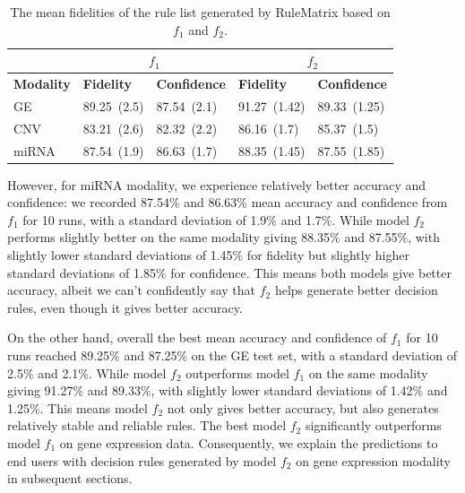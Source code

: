 \begin{table}[h!]
    \centering
    \caption{The mean fidelities of the rule list generated by RuleMatrix based on $f_1$ and $f_2$.}
    \label{table:rules_overall_result}
    \vspace{-2mm}
    \scriptsize{
    \begin{tabular}{l|l|l|l|l} 
        \hline
         & \multicolumn{2}{c|}{$f_1$} & \multicolumn{2}{c}{$f_2$} \\ 
        \hline
        \textbf{Modality} & \textbf{Fidelity} & \textbf{Confidence} & \textbf{Fidelity} & \textbf{Confidence} \\ 
        \hline
        GE  & 89.25~(2.5) & 87.54~(2.1) & 91.27~(1.42) & 89.33~(1.25) \\ 
        \cline{1-3}\cline{4-5}
        CNV & 83.21~(2.6) & 82.32~(2.2) & 86.16~(1.7) & 85.37~(1.5) \\ 
        \hline
        miRNA & 87.54~(1.9) & 86.63~(1.7) & 88.35~(1.45) & 87.55~(1.85) \\
        \hline
    \end{tabular}}
    \vspace{-4mm}
\end{table}

However, for miRNA modality, we experience relatively better accuracy and confidence: we recorded 87.54\% and 86.63\% mean accuracy and confidence from $f_1$ for 10 runs, with a standard deviation of 1.9\% and 1.7\%. While model $f_2$ performs slightly better on the same modality giving 88.35\% and 87.55\%, with slightly lower standard deviations of 1.45\% for fidelity but slightly higher standard deviations of 1.85\% for confidence. This means both models give better accuracy, albeit we can't confidently say that $f_2$ helps generate better decision rules, even though it gives better accuracy. 

\hspace*{3.5mm} On the other hand, overall the best mean accuracy and confidence of $f_1$ for 10 runs reached 89.25\% and 87.25\% on the GE test set, with a standard deviation of 2.5\% and 2.1\%. While model $f_2$ outperforms model $f_1$ on the same modality giving 91.27\% and 89.33\%, with slightly lower standard deviations of 1.42\% and 1.25\%. This means model $f_2$ not only gives better accuracy, but also generates relatively stable and reliable rules. The best model $f_2$ significantly outperforms model $f_1$ on gene expression data. Consequently, we explain the predictions to end users with decision rules generated by model $f_2$ on gene expression modality in subsequent sections. 

